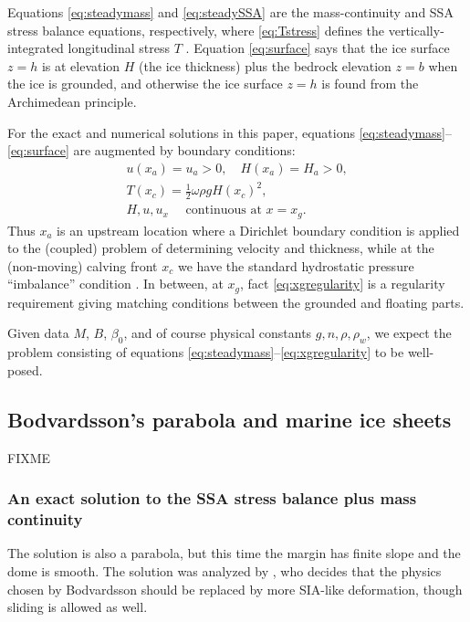 \documentclass[twocolumn,letterpaper]{igs}
\begin{document}
Equations \eqref{eq:steadymass} and \eqref{eq:steadySSA} are the mass-continuity and SSA stress balance equations, respectively, where \eqref{eq:Tstress} defines the vertically-integrated longitudinal stress $T$ \citep{SchoofStream}.  Equation \eqref{eq:surface} says that the ice surface $z=h$ is at elevation $H$ (the ice thickness) plus the bedrock elevation $z=b$ when the ice is grounded, and otherwise the ice surface $z=h$ is found from the Archimedean principle.

For the exact and numerical solutions in this paper, equations \eqref{eq:steadymass}--\eqref{eq:surface} are augmented by boundary conditions:
\begin{gather}
u(x_a) = u_a > 0, \quad H(x_a) = H_a > 0, \label{eq:leftbc} \\
T(x_c) = \frac{1}{2} \omega \rho g H(x_c)^2,  \label{eq:rightbc} \\
H, u, u_x \quad \text{ continuous at } x = x_g.  \label{eq:xgregularity}
\end{gather}
Thus $x_a$ is an upstream location where a Dirichlet boundary condition is applied to the (coupled) problem of determining velocity and thickness, while at the (non-moving) calving front $x_c$ we have the standard hydrostatic pressure ``imbalance'' condition \citep{SchoofMarine1}.  In between, at $x_g$, fact \eqref{eq:xgregularity} is a regularity requirement giving matching conditions between the grounded and floating parts.

Given data $M$, $B$, $\beta_0$, and of course physical constants $g,n,\rho,\rho_w$, we expect the problem consisting of equations \eqref{eq:steadymass}--\eqref{eq:xgregularity} to be well-posed. 

\subsection*{Bodvardsson's parabola and marine ice sheets}

FIXME

\subsubsection*{An exact solution to the SSA stress balance plus mass continuity}
The \cite{Bodvardsson} solution is also a parabola, but this time the margin has finite slope and the dome is smooth.  The \cite{Bodvardsson} solution was analyzed by \cite{Weertman61stability}, who decides that the physics chosen by Bodvardsson should be replaced by more SIA-like deformation, though sliding is allowed as well.
\end{document}
